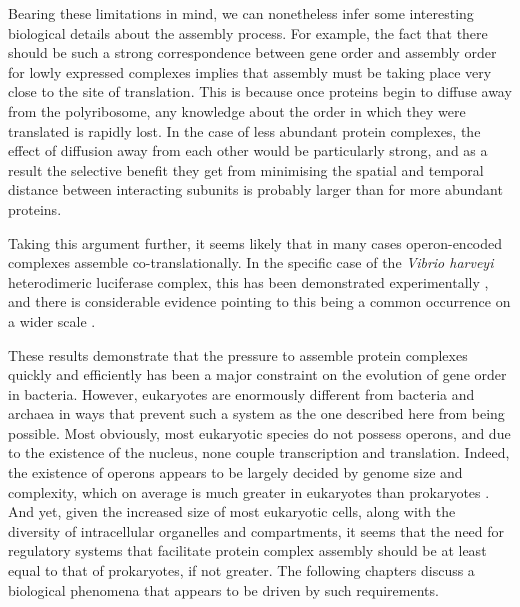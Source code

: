 \documentclass[a4paper,11pt,twoside,openright]{scrbook}
\begin{document}
Bearing these limitations in mind, we can nonetheless infer some interesting biological details about the assembly process. For example, the fact that there should be such a strong correspondence between gene order and assembly order for lowly expressed complexes implies that assembly must be taking place very close to the site of translation. This is because once proteins begin to diffuse away from the polyribosome, any knowledge about the order in which they were translated is rapidly lost. In the case of less abundant protein complexes, the effect of diffusion away from each other would be particularly strong, and as a result the selective benefit they get from minimising the spatial and temporal distance between interacting subunits is probably larger than for more abundant proteins.

Taking this argument further, it seems likely that in many cases operon-encoded complexes assemble co-translationally. In the specific case of the \textit{Vibrio harveyi} heterodimeric luciferase complex, this has been demonstrated experimentally \cite{Shieh2015a}, and there is considerable evidence pointing to this being a common occurrence on a wider scale \cite{Duncan2011,Wells2015,Natan2017}.

These results demonstrate that the pressure to assemble protein complexes quickly and efficiently has been a major constraint on the evolution of gene order in bacteria. However, eukaryotes are enormously different from bacteria and archaea in ways that prevent such a system as the one described here from being possible. Most obviously, most eukaryotic species do not possess operons, and due to the existence of the nucleus, none couple transcription and translation. Indeed, the existence of operons appears to be largely decided by genome size and complexity, which on average is much greater in eukaryotes than prokaryotes \cite{Nunez2013}. And yet, given the increased size of most eukaryotic cells, along with the diversity of intracellular organelles and compartments, it seems that the need for regulatory systems that facilitate protein complex assembly should be at least equal to that of prokaryotes, if not greater. The following chapters discuss a biological phenomena that appears to be driven by such requirements.

\end{document}
